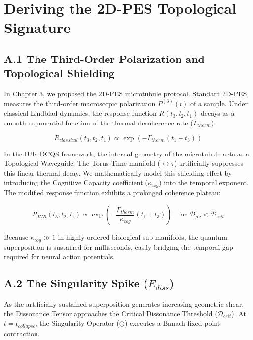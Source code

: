 \documentclass[12pt,openany]{book}
\begin{document}
\appendix

\chapter{Deriving the 2D-PES Topological Signature}

\section{A.1 The Third-Order Polarization and Topological Shielding}
In Chapter 3, we proposed the 2D-PES microtubule protocol. Standard 2D-PES measures the third-order macroscopic polarization $P^{(3)}(t)$ of a sample. Under classical Lindblad dynamics, the response function $R(t_3, t_2, t_1)$ decays as a smooth exponential function of the thermal decoherence rate ($\Gamma_{therm}$):

\begin{equation}
R_{classical}(t_3, t_2, t_1) \propto \exp \left( -\Gamma_{therm} (t_1 + t_3) \right)
\end{equation}

In the IUR-OCQS framework, the internal geometry of the microtubule acts as a Topological Waveguide. The Torus-Time manifold ($\leftrightarrow\tau$) artificially suppresses this linear thermal decay. We mathematically model this shielding effect by introducing the Cognitive Capacity coefficient ($\kappa_{cog}$) into the temporal exponent. The modified response function exhibits a prolonged coherence plateau:

\begin{equation}
R_{IUR}(t_3, t_2, t_1) \propto \exp \left( - \frac{\Gamma_{therm}}{\kappa_{cog}} (t_1 + t_3) \right) \quad \text{for } \mathcal{D}_{\mu\nu} < \mathcal{D}_{crit}
\end{equation}

Because $\kappa_{cog} \gg 1$ in highly ordered biological sub-manifolds, the quantum superposition is sustained for milliseconds, easily bridging the temporal gap required for neural action potentials. 

\section{A.2 The Singularity Spike ($E_{diss}$)}
As the artificially sustained superposition generates increasing geometric shear, the Dissonance Tensor approaches the Critical Dissonance Threshold ($\mathcal{D}_{crit}$). At $t = t_{collapse}$, the Singularity Operator ($\bigcirc$) executes a Banach fixed-point contraction. 
\end{document}
